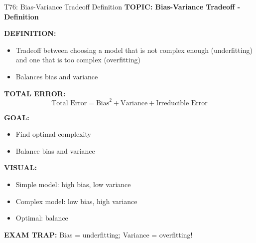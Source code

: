 \documentclass[8pt]{beamer}
\begin{document}
	\begin{frame}{T76: Bias-Variance Tradeoff Definition}
		\fontsize{6.5}{7.5}\selectfont
		\textbf{TOPIC: Bias-Variance Tradeoff - Definition}
		
		\vspace{0.1cm}
		\textbf{DEFINITION:}
		\begin{itemize}
			\item Tradeoff between choosing a model that is not complex enough (underfitting) and one that is too complex (overfitting)
			\item Balances bias and variance
		\end{itemize}
		
		\vspace{0.1cm}
		\textbf{TOTAL ERROR:}
		\[
		\text{Total Error} = \text{Bias}^2 + \text{Variance} + \text{Irreducible Error}
		\]
		
		\vspace{0.1cm}
		\textbf{GOAL:}
		\begin{itemize}
			\item Find optimal complexity
			\item Balance bias and variance
		\end{itemize}
		
		\vspace{0.1cm}
		\textbf{VISUAL:}
		\begin{itemize}
			\item Simple model: high bias, low variance
			\item Complex model: low bias, high variance
			\item Optimal: balance
		\end{itemize}
		
		\textcolor{myred}{\textbf{EXAM TRAP:}} Bias = \textcolor{myblue}{underfitting}; Variance = \textcolor{myblue}{overfitting}!
	\end{frame}
	
\end{document}
